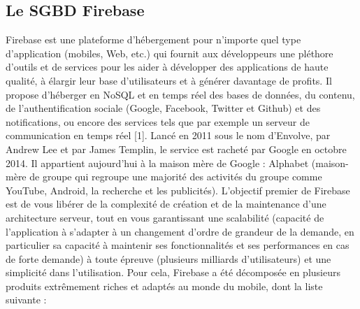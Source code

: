 \subsection{Le SGBD Firebase}

Firebase est une plateforme d’hébergement pour n’importe quel type d’application (mobiles,
Web, etc.) qui fournit aux développeurs une pléthore d'outils et de services pour les aider à
développer des applications de haute qualité, à élargir leur base d'utilisateurs et à générer
davantage de profits. Il propose d'héberger en NoSQL et en temps réel des bases de données,
du contenu, de l'authentification sociale (Google, Facebook, Twitter et Github) et des notifications, ou encore des services tels que par exemple un serveur de communication en
temps réel [1].
Lancé en 2011 sous le nom d'Envolve, par Andrew Lee et par James Templin, le service est
racheté par Google en octobre 2014. Il appartient aujourd'hui à la maison mère de Google :
Alphabet (maison-mère de groupe qui regroupe une majorité des activités du groupe comme
YouTube, Android, la recherche et les publicités). L'objectif premier de Firebase est de vous
libérer de la complexité de création et de la maintenance d'une architecture serveur, tout en vous
garantissant une scalabilité (capacité de l’application à s'adapter à un changement d'ordre de
grandeur de la demande, en particulier sa capacité à maintenir ses fonctionnalités et ses
performances en cas de forte demande) à toute épreuve (plusieurs milliards d'utilisateurs) et une
simplicité dans l'utilisation. Pour cela, Firebase a été décomposée en plusieurs produits
extrêmement riches et adaptés au monde du mobile, dont la liste suivante :
